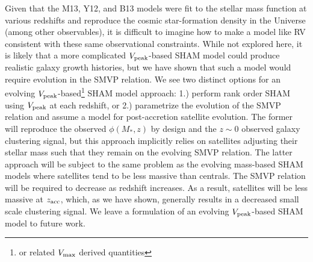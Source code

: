 \documentclass[useAMS,fleqn,usenatbib]{mnras}
\begin{document}
Given that the M13, Y12, and B13 models were fit to the stellar mass function at various redshifts and reproduce the cosmic star-formation density in the Universe (among other observables), it is difficult to imagine how to make a model like RV consistent with these same observational constraints.  While not explored here, it is likely that a more complicated $V_{\rm peak}$-based SHAM model could produce realistic galaxy growth histories, but we have shown that such a model would require evolution in the SMVP relation. We see two distinct options for an evolving $V_{\rm peak}$-based\footnote{or related $V_{\rm max}$ derived quantities} SHAM model approach: 1.) perform rank order SHAM using $V_{\rm peak}$ at each redshift, or 2.) parametrize the evolution of the SMVP relation and assume a model for post-accretion satellite evolution.  The former will reproduce the observed $\phi(M_*, z)$ by design and the $z\sim 0$ observed galaxy clustering signal, but this approach implicitly relies on satellites adjusting their stellar mass such that they remain on the evolving SMVP relation.  The latter approach will be subject to the same problem as the evolving mass-based SHAM models where satellites tend to be less massive than centrals. The SMVP relation will be required to decrease as redshift increases. As a result, satellites will be less massive at $z_{\rm acc}$, which, as we have shown, generally results in a decreased small scale clustering signal. We leave a formulation of an evolving $V_{\rm peak}$-based SHAM model to future work.
\end{document}
